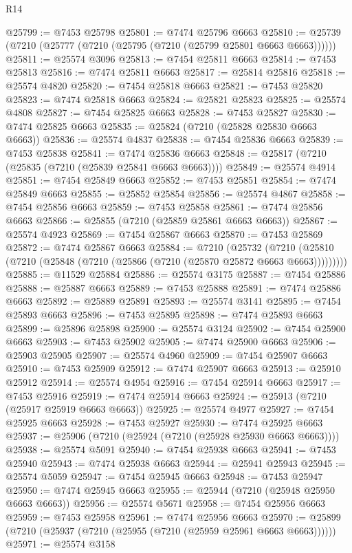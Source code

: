 \begin{lexlean}{R14}
\begin{coremodule}
@25799 := @7453 @25798
@25801 := @7474 @25796 @6663
@25810 := @25739 (@7210 (@25777 (@7210 (@25795 (@7210 (@25799 @25801 @6663 @6663))))))
@25811 := @25574 @3096
@25813 := @7454 @25811 @6663
@25814 := @7453 @25813
@25816 := @7474 @25811 @6663
@25817 := @25814 @25816
@25818 := @25574 @4820
@25820 := @7454 @25818 @6663
@25821 := @7453 @25820
@25823 := @7474 @25818 @6663
@25824 := @25821 @25823
@25825 := @25574 @4808
@25827 := @7454 @25825 @6663
@25828 := @7453 @25827
@25830 := @7474 @25825 @6663
@25835 := @25824 (@7210 (@25828 @25830 @6663 @6663))
@25836 := @25574 @4837
@25838 := @7454 @25836 @6663
@25839 := @7453 @25838
@25841 := @7474 @25836 @6663
@25848 := @25817 (@7210 (@25835 (@7210 (@25839 @25841 @6663 @6663))))
@25849 := @25574 @4914
@25851 := @7454 @25849 @6663
@25852 := @7453 @25851
@25854 := @7474 @25849 @6663
@25855 := @25852 @25854
@25856 := @25574 @4867
@25858 := @7454 @25856 @6663
@25859 := @7453 @25858
@25861 := @7474 @25856 @6663
@25866 := @25855 (@7210 (@25859 @25861 @6663 @6663))
@25867 := @25574 @4923
@25869 := @7454 @25867 @6663
@25870 := @7453 @25869
@25872 := @7474 @25867 @6663
@25884 := @7210
    (@25732 (@7210 (@25810 (@7210 (@25848 (@7210 (@25866 (@7210 (@25870 @25872 @6663 @6663)))))))))
@25885 := @11529 @25884
@25886 := @25574 @3175
@25887 := @7454 @25886
@25888 := @25887 @6663
@25889 := @7453 @25888
@25891 := @7474 @25886 @6663
@25892 := @25889 @25891
@25893 := @25574 @3141
@25895 := @7454 @25893 @6663
@25896 := @7453 @25895
@25898 := @7474 @25893 @6663
@25899 := @25896 @25898
@25900 := @25574 @3124
@25902 := @7454 @25900 @6663
@25903 := @7453 @25902
@25905 := @7474 @25900 @6663
@25906 := @25903 @25905
@25907 := @25574 @4960
@25909 := @7454 @25907 @6663
@25910 := @7453 @25909
@25912 := @7474 @25907 @6663
@25913 := @25910 @25912
@25914 := @25574 @4954
@25916 := @7454 @25914 @6663
@25917 := @7453 @25916
@25919 := @7474 @25914 @6663
@25924 := @25913 (@7210 (@25917 @25919 @6663 @6663))
@25925 := @25574 @4977
@25927 := @7454 @25925 @6663
@25928 := @7453 @25927
@25930 := @7474 @25925 @6663
@25937 := @25906 (@7210 (@25924 (@7210 (@25928 @25930 @6663 @6663))))
@25938 := @25574 @5091
@25940 := @7454 @25938 @6663
@25941 := @7453 @25940
@25943 := @7474 @25938 @6663
@25944 := @25941 @25943
@25945 := @25574 @5059
@25947 := @7454 @25945 @6663
@25948 := @7453 @25947
@25950 := @7474 @25945 @6663
@25955 := @25944 (@7210 (@25948 @25950 @6663 @6663))
@25956 := @25574 @5671
@25958 := @7454 @25956 @6663
@25959 := @7453 @25958
@25961 := @7474 @25956 @6663
@25970 := @25899 (@7210 (@25937 (@7210 (@25955 (@7210 (@25959 @25961 @6663 @6663))))))
@25971 := @25574 @3158

\end{coremodule}
\end{lexlean}
